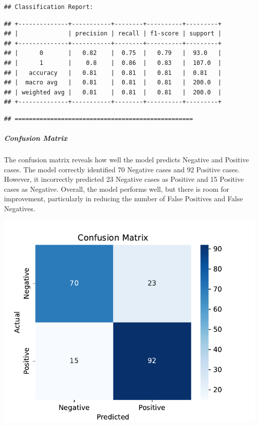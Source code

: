 \documentclass[preprint, 3p,
authoryear]{elsarticle} %
\begin{document}
\begin{verbatim}
## Classification Report:
\end{verbatim}

\begin{verbatim}
## +--------------+-----------+--------+----------+---------+
## |              | precision | recall | f1-score | support |
## +--------------+-----------+--------+----------+---------+
## |      0       |   0.82    |  0.75  |   0.79   |  93.0   |
## |      1       |    0.8    |  0.86  |   0.83   |  107.0  |
## |   accuracy   |   0.81    |  0.81  |   0.81   |  0.81   |
## |  macro avg   |   0.81    |  0.81  |   0.81   |  200.0  |
## | weighted avg |   0.81    |  0.81  |   0.81   |  200.0  |
## +--------------+-----------+--------+----------+---------+
\end{verbatim}

\begin{verbatim}
## ==================================================
\end{verbatim}

\subparagraph{Confusion Matrix}\label{confusion-matrix}

The confusion matrix reveals how well the model predicts Negative and
Positive cases. The model correctly identified 70 Negative cases and 92
Positive cases. However, it incorrectly predicted 23 Negative cases as
Positive and 15 Positive cases as Negative. Overall, the model performs
well, but there is room for improvement, particularly in reducing the
number of False Positives and False Negatives.

\begin{center}\includegraphics[width=0.7\linewidth]{Final-Report_files/figure-latex/unnamed-chunk-8-5} \end{center}

\newpage
\end{document}
